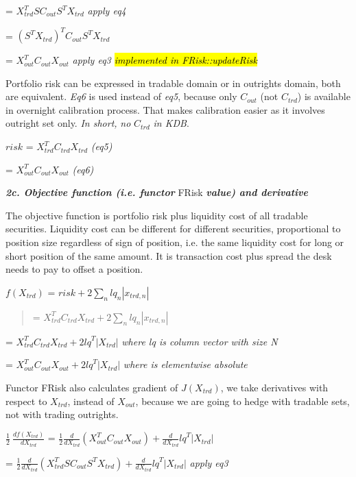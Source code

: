 = \(X_{trd}^{T}SC_{out}S^{T}X_{trd}\) \emph{apply eq4}

= \({(S^{T}X_{trd})}^{T}C_{out}S^{T}X_{trd}\)

= \(X_{out}^{T}C_{out}X_{out}\) \emph{apply eq3 \hl{implemented in
FRisk::updateRisk}}

Portfolio risk can be expressed in tradable domain or in outrights
domain, both are equivalent. \emph{Eq6} is used instead of \emph{eq5},
because only \(C_{out}\) (not \(C_{trd}\)) is available in overnight
calibration process. That makes calibration easier as it involves
outright set only. \emph{In short,} \emph{no} \(C_{trd}\) \emph{in KDB}.

\(risk\) = \(X_{trd}^{T}C_{trd}X_{trd}\) \emph{(eq5)}

= \(X_{out}^{T}C_{out}X_{out}\) \emph{(eq6)}

\emph{\textbf{2c. Objective function (i.e. functor}} FRisk
\emph{\textbf{value) and derivative}}

The objective function is portfolio risk plus liquidity cost of all
tradable securities. Liquidity cost can be different for different
securities, proportional to position size regardless of sign of
position, i.e. the same liquidity cost for long or short position of the
same amount. It is transaction cost plus spread the desk needs to pay to
offset a position.

\(f(X_{trd})\) =
\(risk + 2\sum_{n}^{}{{lq}_{n}\left| x_{trd,n} \right|}\)

\begin{quote}
=
\(X_{trd}^{T}C_{trd}X_{trd} + 2\sum_{n}^{}{{lq}_{n}\left| x_{trd,n} \right|}\)
\end{quote}

= \(X_{trd}^{T}C_{trd}X_{trd} + 2{lq}^{T}\left| X_{trd} \right|\)
\emph{where lq is column vector with size N}

= \(X_{out}^{T}C_{out}X_{out} + 2{lq}^{T}\left| X_{trd} \right|\)
\emph{where \textbar\textbar{} is elementwise absolute}

Functor FRisk also calculates gradient of \(J(X_{trd})\), we take
derivatives with respect to \(X_{trd}\), instead of \(X_{out}\), because
we are going to hedge with tradable sets, not with trading outrights.

\(\frac{1}{2}\ \frac{df(X_{trd})}{dX_{trd}}\) =
\(\frac{1}{2}\frac{d}{dX_{trd}}(X_{out}^{T}C_{out}X_{out}) + \frac{d}{dX_{trd}}{lq}^{T}\left| X_{trd} \right|\)

=
\(\frac{1}{2}\frac{d}{dX_{trd}}(X_{trd}^{T}SC_{out}S^{T}X_{trd}) + \frac{d}{dX_{trd}}{lq}^{T}\left| X_{trd} \right|\)
\emph{apply eq3}


